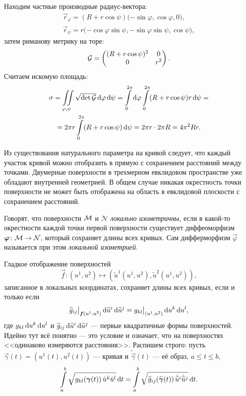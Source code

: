 \begin{solution}
	Находим частные производные радиус-вектора:
	\begin{gather*}
		\vec{r}_\varphi = (R + r\cos\psi)\big({-\sin\varphi}, \cos\varphi, 0\big),\\
		\vec{r}_\psi = r\big({-\cos\varphi\sin\psi}, -\sin\varphi\sin\psi, \cos\psi\big),
	\end{gather*}
	затем риманову метрику на торе:
	\[
		\mathcal{G} =
		\begin{pmatrix}
			(R + r\cos\psi)^2 & 0\\
			0 & r^2
		\end{pmatrix}.
	\]
	Считаем искомую площадь:
	\begin{multline*}
		\sigma = \iint\limits_{\varphi, \psi}\sqrt{\det\mathcal{G}}\mathop{}\!\mathrm{d}\varphi\mathop{}\!\mathrm{d}\psi = \int\limits_0^{2\pi}\mathop{}\!\mathrm{d}\varphi\int\limits_0^{2\pi}(R + r\cos\psi)r\mathop{}\!\mathrm{d}\psi =\\ = 2\pi r\int\limits_0^{2\pi}(R + r\cos\psi)\mathop{}\!\mathrm{d}\psi = 2\pi r \cdot 2\pi R = 4\pi^2 Rr.
	\end{multline*}
\end{solution}

Из существования натурального параметра на кривой следует, что каждый участок кривой можно отобразить в прямую с сохранением расстояний между точками. Двумерные поверхности в трехмерном евклидовом пространстве уже обладают внутренней геометрией. В общем случае никакая окрестность точки поверхности не может быть отображена на область в евклидовой плоскости с сохранением расстояний.

\begin{definition}
	Говорят, что поверхности $\mathcal{M}$ и $\mathcal{N}$ \textit{локально изометричны}, если в какой-то окрестности каждой точки первой поверхности существует диффеоморфизм $\boldsymbol{\varphi}\colon \mathcal{M} \to \mathcal{N}$, который сохраняет длины всех кривых. Сам дифферморфизм $\vec{\varphi}$ называется при этом \textit{локальной изометрией}.
\end{definition}

\noindent
Гладкое отображение поверхностей
\[
	\vec{f}\colon (u^1, u^2) \mapsto (\widetilde{u}^1(u^1, u^2), \widetilde{u}^2(u^1, u^2)),
\]
записанное в локальных координатах, сохраняет длины всех кривых, если и только если
\begin{equation} \label{eq:Isometry}
	\widetilde{g}_{ij}\big|_{\boldsymbol{f}(u^1, u^2)}\mathop{}\!\mathrm{d}\widetilde{u}^i\mathop{}\!\mathrm{d}\widetilde{u}^j = g_{kl}\big|_{(u^1, u^2)}\mathop{}\!\mathrm{d} u^k\mathop{}\!\mathrm{d} u^l,
\end{equation}
где $g_{kl}\mathop{}\!\mathrm{d} u^k\mathop{}\!\mathrm{d} u^l$ и $\widetilde{g}_{ij}\mathop{}\!\mathrm{d}\widetilde{u}^i\mathop{}\!\mathrm{d}\widetilde{u}^j$ --- первые квадратичные формы поверхностей. Идейно тут всё понятно --- это условие и означает, что на поверхностях <<одинаково измеряются расстояния>>. Распишем строго: пусть $\vec{\gamma}(t) = (u^1(t), u^2(t))$ --- кривая и $\widetilde{\vec{\gamma}}(t)$ --- её образ, $a \leqslant t \leqslant b$,
\[
	\int\limits_a^b\sqrt{g_{kl}(\boldsymbol{\gamma}(t))\,\dot{u}^k\dot{u}^l}\mathop{}\!\mathrm{d} t = \int\limits_a^b\sqrt{\widetilde{g}_{ij}(\widetilde{\boldsymbol{\gamma}}(t))\,\dot{\widetilde{u}}{}^i\dot{\widetilde{u}}{}^j}\mathop{}\!\mathrm{d} t.
\]

